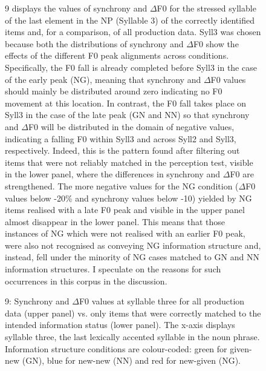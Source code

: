 \begin{figure}
\caption{9 displays the values of synchrony and ${\Delta}$F0 for the stressed syllable of the last element in the NP (Syllable 3) of the correctly identified items and, for a comparison, of all production data. Syll3 was chosen because both the distributions of synchrony and ${\Delta}$F0 show the effects of the different F0 peak alignments across conditions. Specifically, the F0 fall is already completed before Syll3 in the case of the early peak (NG), meaning that synchrony and ${\Delta}$F0 values should mainly be distributed around zero indicating no F0 movement at this location. In contrast, the F0 fall takes place on Syll3 in the case of the late peak (GN and NN) so that synchrony and ${\Delta}$F0 will be distributed in the domain of negative values, indicating a falling F0 within Syll3 and across Syll2 and Syll3, respectively. Indeed, this is the pattern found after filtering out items that were not reliably matched in the perception test, visible in the lower panel, where the differences in synchrony and ${\Delta}$F0 are strengthened. The more negative values for the NG condition (${\Delta}$F0 values below -20\% and synchrony values below -10) yielded by NG items realised with a late F0 peak and visible in the upper panel almost disappear in the lower panel. This means that those instances of NG which were not realised with an earlier F0 peak, were also not recognised as conveying NG information structure and, instead, fell under the minority of NG cases matched to GN and NN information structures. I speculate on the reasons for such occurrences in this corpus in the discussion.}
\label{fig:key:2}
\end{figure}

\begin{stylecaption}
  
 
\end{stylecaption}

\begin{stylecaption}\begin{figure}
\caption{9: Synchrony and ${\Delta}$F0 values at syllable three for all production data (upper panel) vs. only items that were correctly matched to the intended information status (lower panel). The x-axis displays syllable three, the last lexically accented syllable in the noun phrase. Information structure conditions are colour-coded: green for given-new (GN), blue for new-new (NN) and red for new-given (NG).}
\label{fig:key:2}
\end{figure}\end{stylecaption}

